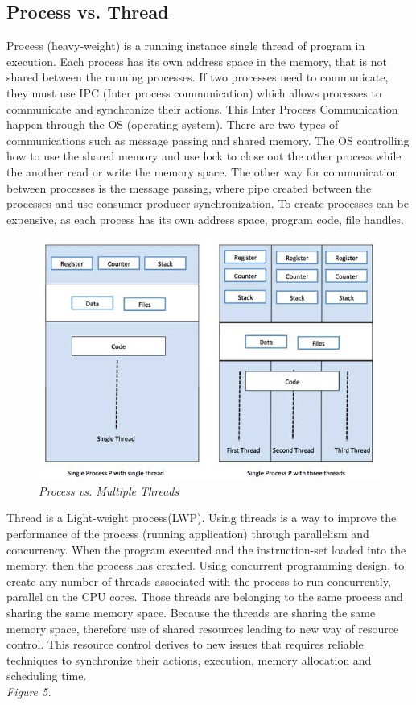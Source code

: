 \documentclass[12pt]{article}
\begin{document}
\subsection{Process vs. Thread}
Process (heavy-weight) is a running instance single thread of program in execution. Each process has its own address space in the memory, that is not shared between the running processes. If two processes need to communicate, they must use IPC (Inter process communication) which allows processes to communicate and synchronize their actions. This Inter Process Communication happen through the OS (operating system). There are two types of communications such as message passing and shared memory. The OS controlling how to use the shared memory and use lock to close out the other process while the another read or write the memory space. The other way for communication between processes is the message passing, where pipe created between the processes and use consumer-producer synchronization. To create processes can be expensive, as each process has its own address space, program code, file handles.\\

\begin{figure}[h!]
\centering
\includegraphics[scale=0.5]{Pictures/single_multi_thread.png}
\caption{\textit{\color{gray}Process vs. Multiple Threads \cite{Nikolay}}}
\end{figure}

Thread is a Light-weight process(LWP). Using threads is a way to improve the performance of the process (running application) through parallelism and concurrency. When the program executed and the instruction-set loaded into the memory, then the process has created. Using concurrent programming design, to create any number of threads associated with the process to run concurrently, parallel on the CPU cores. Those threads are belonging to the same process and sharing the same memory space. Because the threads are sharing the same memory space, therefore use of shared resources leading to new way of resource control. This resource control derives to new issues that requires reliable techniques to synchronize their actions, execution, memory allocation and scheduling time.\cite{Tutorialspoint}\\\textit{\color{gray}Figure 5.}\\\\
 
\end{document}
